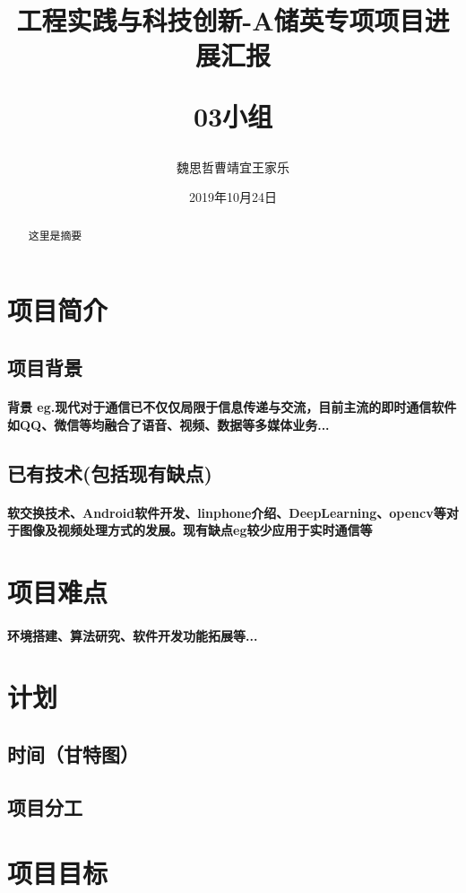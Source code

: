 \documentclass[12pt]{extarticle}
\title{工程实践与科技创新\Romannum{3}-A储英专项项目进展汇报\\
\begin{large}
    03小组
\end{large}}
\author{魏思哲\quad 曹靖宜\quad 王家乐}
\date{2019年10月24日}
\newcommand{\<}{\langle}
\renewcommand{\>}{\rangle}
\theoremstyle{definition}
\begin{document}
\maketitle
\begin{abstract}
    这里是摘要
\end{abstract}
\section{项目简介}
\subsection{项目背景}
\paragraph{背景 eg.现代对于通信已不仅仅局限于信息传递与交流，目前主流的即时通信软件如QQ、微信等均融合了语音、视频、数据等多媒体业务...}
\subsection{已有技术(包括现有缺点)}
\paragraph{软交换技术、Android软件开发、linphone介绍、DeepLearning、opencv等对于图像及视频处理方式的发展。现有缺点eg较少应用于实时通信等}

\section{项目难点}
\paragraph{环境搭建、算法研究、软件开发功能拓展等...}

\section{计划}
\subsection{时间（甘特图）}
\subsection{项目分工}


\section{项目目标}
\end{document}
